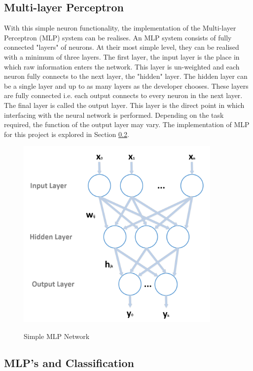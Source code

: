 \documentclass[11pt]{article}
\begin{document}
	\subsection{Multi-layer Perceptron}
	With this simple neuron functionality, the implementation of the Multi-layer Perceptron (MLP) system can be realises. An MLP system consists of fully connected "layers" of neurons. At their most simple level, they can be realised with a minimum of three layers. The first layer, the input layer is the place in which raw information enters the network. This layer is un-weighted and each neuron fully connects to the next layer, the "hidden" layer. The hidden layer can be a single layer and up to as many layers as the developer chooses. These layers are fully connected i.e. each output connects to every neuron in the next layer. The final layer is called the output layer. This layer is the direct point in which interfacing with the neural network is performed. Depending on the task required, the function of the output layer may vary. The implementation of MLP for this project is explored in Section \ref{sec:mlp_class}.
	
	\begin{figure}[H]
		\centering
		\includegraphics[width=10cm]{Figures/mlp}
		\caption{Simple MLP Network}\cite{Bonaccorso2017}
		\label{fig:mlp}
	\end{figure}
	
	\subsection{MLP's and Classification}\label{sec:mlp_class}
	
	
\end{document}
